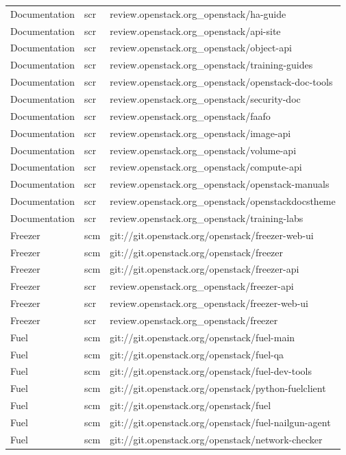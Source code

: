 \begin{center}
\begin{longtable}{|p{4cm}|p{1cm}|p{10cm}|}
Documentation&scr&review.openstack.org\_openstack/ha-guide\\ 
Documentation&scr&review.openstack.org\_openstack/api-site\\ 
Documentation&scr&review.openstack.org\_openstack/object-api\\ 
Documentation&scr&review.openstack.org\_openstack/training-guides\\ 
Documentation&scr&review.openstack.org\_openstack/openstack-doc-tools\\ 
Documentation&scr&review.openstack.org\_openstack/security-doc\\ 
Documentation&scr&review.openstack.org\_openstack/faafo\\ 
Documentation&scr&review.openstack.org\_openstack/image-api\\ 
Documentation&scr&review.openstack.org\_openstack/volume-api\\ 
Documentation&scr&review.openstack.org\_openstack/compute-api\\ 
Documentation&scr&review.openstack.org\_openstack/openstack-manuals\\ 
Documentation&scr&review.openstack.org\_openstack/openstackdocstheme\\ 
Documentation&scr&review.openstack.org\_openstack/training-labs\\ 
Freezer&scm&git://git.openstack.org/openstack/freezer-web-ui\\ 
Freezer&scm&git://git.openstack.org/openstack/freezer\\ 
Freezer&scm&git://git.openstack.org/openstack/freezer-api\\ 
Freezer&scr&review.openstack.org\_openstack/freezer-api\\ 
Freezer&scr&review.openstack.org\_openstack/freezer-web-ui\\ 
Freezer&scr&review.openstack.org\_openstack/freezer\\ 
Fuel&scm&git://git.openstack.org/openstack/fuel-main\\ 
Fuel&scm&git://git.openstack.org/openstack/fuel-qa\\ 
Fuel&scm&git://git.openstack.org/openstack/fuel-dev-tools\\ 
Fuel&scm&git://git.openstack.org/openstack/python-fuelclient\\ 
Fuel&scm&git://git.openstack.org/openstack/fuel\\ 
Fuel&scm&git://git.openstack.org/openstack/fuel-nailgun-agent\\ 
Fuel&scm&git://git.openstack.org/openstack/network-checker\\ 

\end{longtable}
\end{center}
